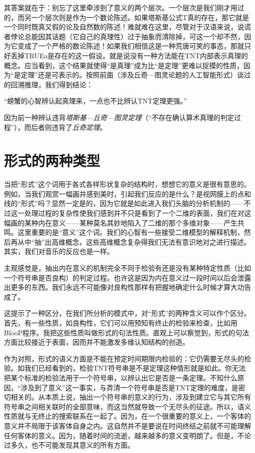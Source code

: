其答案就在于：别忘了这里牵涉到了意义的两个层次。一个层次是我们刚才用过的，而另一个层次则是作为一个数论陈述。如果塔斯基公式T真的存在，那它就是一个同时既真又假的论及自然数的陈述！难就难在这里，尽管对于汉语来说，说谎者悖论总能因其话题（它自己的真理性）过于抽象而清除掉，可这一个却不然，因为它变成了一个严格的数论陈述！如果我们相信这是一种荒唐可笑的事态，那就只好丢掉TRUE{a}是存在的这一假设。就是说没有一种方法能在TNT内部表示真理的概念。应当看到，这个结果就使得“是真理”成为比“是定理”更难以捉摸的性质，因为“是定理”还是可表示的。按照前面（涉及丘奇—图灵论题的人工智能形式）谈过的回溯推理，我们得到结论：

\begin{block}
“螃蟹的心智辨认起真理来，一点也不比辨认TNT定理更强。”
\end{block}
因为前一种辨认违背\emph{塔斯基—丘奇—图灵定理}（“不存在确认算术真理的判定过程”），而后者则违背了\emph{丘奇定理}。

\section{形式的两种类型}

当把“形式”这个词用于各式各样形状复杂的结构时，想想它的意义是很有意思的。例如，当我们观赏一幅画并感到美时，引起我们反应的是什么？是视网膜上的点和线的“形式”吗？显然一定是的，因为它就是如此进入我们头脑的分析机制的——不过这一处理过程的复杂性使我们感到并不只是看到了一个二维的表面，我们在对这幅画的某种内在意义——某种莫名其妙地陷入了二维的那个多维对象——产生共鸣。这里重要的是“意义”这个词。我们的心智有一些接受二维模型的解释机制，然后再从中“抽”出高维概念，这些高维概念复杂得我们无法有意识地对之进行描述。其实，我们对音乐的反应也是一样。

主观感觉是，抽出内在意义的机制完全不同于检验有还是没有某种特定性质（比如一个符号串是否良构）的判定过程。也许这是因为内在意义过一段时间以后会泄露出更多的东西。我们永远不可能像对良构性那样有把握地确定什么时候才算大功告成了。

这提示了一种区分，在我们所分析的模式中，对“形式”的两种含义可以作个区分。首先，有一些性质，如良构性，它们可以用预知有终止的检验来检查，比如用BlooP程序。我把这些性质叫做形式的句法性质。直观上可以察觉到，形式的句法方面比较接近于表面，因而并不能激发多维认知结构的创造。

作为对照，形式的语义方面是不能在预定时间期限内检验的：它仍需要无尽头的检验。如我们已经看到的，检验TNT符号串是不是定理这种情形就是如此。你无法把某个标准的检验法用于一个符号串，以辨认出它是否是一条定理。不知什么原因，“涉及到了意义”这一事实，与弄清一个符号串是否是TNT定理的难度，是密切相关的。从本质上说，抽出一个符号串的意义的行为，涉及到建立它与其它所有符号串之间相关联时的全部意味，而这当然就导致一个无尽头的征途。所以，语义性质就与无终止的搜索联系在一起了。因为，在一个很重要的意义上，一个客体的意义并不局限于该客体自身之内。这自然并不是要说在时间终结之前就不可能理解任何客体的意义。因为，随着时间的流逝，越来越多的意义变明朗了。但是，不论过多久，也不可能发现其意义的所有方面。

